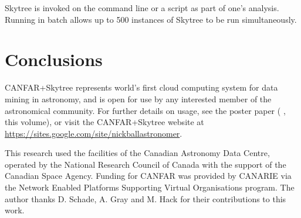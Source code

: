 Skytree is invoked on the command line or a script as part of one's analysis. Running in batch allows up to 500 instances of Skytree to be run simultaneously.

\section{Conclusions}

CANFAR+Skytree represents world's first cloud computing system for data mining in astronomy, and is open for use by any interested member of the astronomical community. For further details on usage, see the poster paper (\citeauthor{ball:adass12poster} \citeyear{ball:adass12poster}, this volume), or visit the CANFAR+Skytree website at \url{https://sites.google.com/site/nickballastronomer}.

\acknowledgements This research used the facilities of the Canadian Astronomy Data Centre, operated by the National Research Council of Canada with the support of the Canadian Space Agency. Funding for CANFAR was provided by CANARIE via the Network Enabled Platforms Supporting Virtual Organisations program. The author thanks D. Schade, A. Gray and M. Hack for their contributions to this work.


